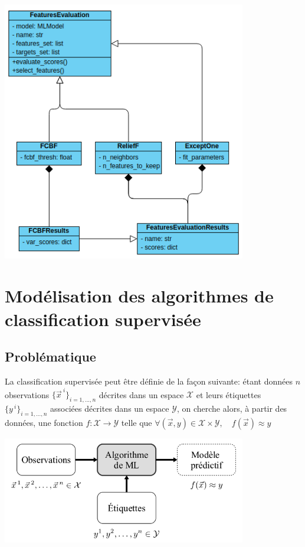 \begin{center}
\includegraphics[width=0.8\textwidth]{figures/diagramme_classe_select.png}
\label{fig14}
\end{center}

\chapter{Modélisation des algorithmes de classification supervisée}
\clearpage
\section{Problématique}

La classification supervisée \cite{azencott2018introduction} peut être définie de la façon suivante: étant données $n$ observations $\lbrace\vec{x}^{\:i}\rbrace_{i=1,...,n}$ décrites dans un espace $\mathcal{X}$ et leurs étiquettes $\lbrace y^{\:i}\rbrace_{i=1,...,n}$ associées décrites dans un espace $\mathcal{Y}$, on cherche alors, à partir des données, une fonction $f:\mathcal{X}\rightarrow\mathcal{Y}$ telle que $\forall(\vec{x},y)\in \mathcal{X}\times\mathcal{Y},\quad f(\vec{x})\approx y$

\begin{center}
\includegraphics[width=0.8\textwidth]{figures/apprentissage_supervise.png}
\label{fig3}
\end{center}

